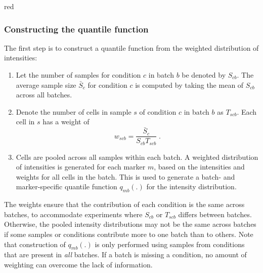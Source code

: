 \documentclass{article}
\begin{document}
\begin{color}{red}
\subsubsection{Constructing the quantile function}
The first step is to construct a quantile function from the weighted distribution of intensities:
\begin{enumerate}
    \item Let the number of samples for condition $c$ in batch $b$ be denoted by $S_{cb}$.
        The average sample size $\bar{S}_c$ for condition $c$ is computed by taking the mean of $S_{cb}$ across all batches.
    \item Denote the number of cells in sample $s$ of condition $c$ in batch $b$ as $T_{scb}$.
        Each cell in $s$ has a weight of 
        \[
            w_{scb} = \frac{\bar{S}_c}{S_{cb}T_{scb}} \;.
        \]
    \item Cells are pooled across all samples within each batch.
        A weighted distribution of intensities is generated for each marker $m$, based on the intensities and weights for all cells in the batch.
        This is used to generate a batch- and marker-specific quantile function $q_{mb}(.)$ for the intensity distribution.
\end{enumerate}
The weights ensure that the contribution of each condition is the same across batches, to accommodate experiments where $S_{cb}$ or $T_{scb}$ differs between batches.
Otherwise, the pooled intensity distributions may not be the same across batches if some samples or conditions contribute more to one batch than to others.
Note that construction of $q_{mb}(.)$ is only performed using samples from conditions that are present in \textit{all} batches.
If a batch is missing a condition, no amount of weighting can overcome the lack of information.


\end{color}
\end{document}

